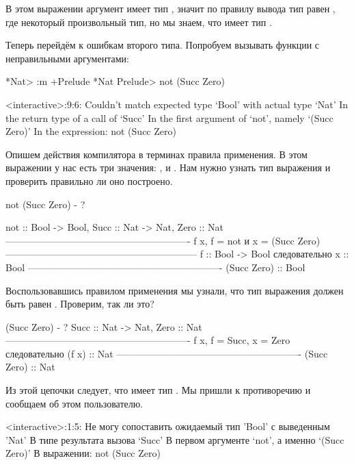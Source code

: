 В этом выражении аргумент  имеет тип , значит по
правилу вывода тип  равен , где 
некоторый произвольный тип, но мы знаем, что  имеет тип
.

Теперь перейдём к ошибкам второго типа. Попробуем вызывать функции с
неправильными аргументами:


\begin{code}
*Nat> :m +Prelude
*Nat Prelude> not (Succ Zero)

<interactive>:9:6:
    Couldn't match expected type `Bool' with actual type `Nat'
    In the return type of a call of `Succ'
    In the first argument of `not', namely `(Succ Zero)'
    In the expression: not (Succ Zero)
\end{code}

Опишем действия компилятора в терминах правила применения. В этом
выражении у нас есть три значения: ,  и . Нам
нужно узнать тип выражения и проверить правильно ли оно построено.


\begin{code}
not (Succ Zero) - ? 

     not :: Bool -> Bool,    Succ :: Nat -> Nat,    Zero :: Nat
     ----------------------------------------------------------
            f x, f = not и x = (Succ Zero)
    ------------------------------------------------------------
            f :: Bool -> Bool следовательно x :: Bool
    -------------------------------------------------------------
            (Succ Zero) :: Bool
\end{code}

Воспользовавшись правилом применения мы узнали, что тип выражения
 должен быть равен . Проверим, так ли это?


\begin{code}
(Succ Zero) - ?
        Succ :: Nat -> Nat,     Zero :: Nat
     ----------------------------------------------------------
            f x, f = Succ, x = Zero следовательно (f x) :: Nat
     ----------------------------------------------------------
                        (Succ Zero) :: Nat
\end{code}

Из этой цепочки следует, что  имеет тип . Мы
пришли к противоречию и сообщаем об этом пользователю.


\begin{code}
<interactive>:1:5:
    Не могу сопоставить ожидаемый тип 'Bool' с выведенным 'Nat'
    В типе результата вызова `Succ'
	В первом аргументе `not', а именно `(Succ Zero)'
    В выражении: not (Succ Zero)	
\end{code}

